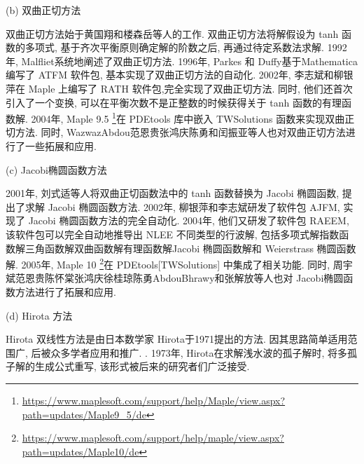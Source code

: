 (b) 双曲正切方法 

双曲正切方法始于黄国翔和楼森岳等人\cite{huang1989exact}的工作. 双曲正切方法将解假设为 tanh 函数的多项式, 基于齐次平衡原则确定解的阶数之后, 再通过待定系数法求解. 1992年, Malfliet\cite{malfliet1992solitary}系统地阐述了双曲正切方法. 1996年, Parkes 和 Duffy\cite{parkes1996automated}基于Mathematica 编写了 ATFM 软件包, 基本实现了双曲正切方法的自动化. 2002年, 李志斌和柳银萍\cite{liu2001master,li2002rath}在 Maple 上编写了 RATH 软件包,完全实现了双曲正切方法. 同时, 他们还首次引入了一个变换, 可以在平衡次数不是正整数的时候获得关于 tanh 函数的有理函数解. 2004年, Maple 9.5 \footnote{\url{https://www.maplesoft.com/support/help/Maple/view.aspx?path=updates/Maple9_5/de}}在 PDEtools 库中嵌入 TWSolutions 函数来实现双曲正切方法. 同时, Wazwaz\cite{wazwaz2004tanh}\D Abdou\cite{abdou2007extended}\D 范恩贵\cite{fan2000extended}\D 张鸿庆\cite{lu2003further}\D 陈勇\cite{zheng2003generalized}和闰振亚\cite{yan2001new}等人也对双曲正切方法进行了一些拓展和应用. 

(c) Jacobi椭圆函数方法

2001年, 刘式适等人\cite{liu2001jacobi}将双曲正切函数法中的 tanh 函数替换为 Jacobi 椭圆函数, 提出了求解 Jacobi 椭圆函数方法. 2002年, 柳银萍和李志斌\cite{yin2002automated}研发了软件包 AJFM, 实现了 Jacobi 椭圆函数方法的完全自动化. 2004年, 他们\cite{li2004raeem}又研发了软件包 RAEEM, 该软件包可以完全自动地推导出 NLEE 不同类型的行波解, 包括多项式解\D 指数函数解\D 三角函数解\D 双曲函数解\D 有理函数解\D Jacobi 椭圆函数解和 Weierstrass 椭圆函数解. 2005年, Maple 10 \footnote{\url{https://www.maplesoft.com/support/help/maple/view.aspx?path=updates/Maple10/de}}在 PDEtools[TWSolutions] 中集成了相关功能. 同时, 周宇斌\cite{zhou2003periodic}\D 范恩贵\cite{fan2002applications}\D 陈怀棠\cite{chen2003improved}\D 张鸿庆\cite{yu2005extended}\D 徐桂琼\cite{gui2005applications}\D 陈勇\cite{chen2005extended}\D Abdou\cite{abdou2007construction}\D Bhrawy\cite{bhrawy2013cnoidal}和张解放\cite{jia2004general,chao2005symbolic}等人也对 Jacobi椭圆函数方法进行了拓展和应用. 

(d) Hirota 方法

Hirota 双线性方法是由日本数学家 Hirota\cite{hirota1971exact}于1971提出的方法. 因其思路简单\D 适用范围广, 后被众多学者应用和推广. . 1973年, Hirota\cite{hirota1973exact}在求解浅水波的孤子解时, 将多孤子解的生成公式重写, 该形式被后来的研究者们广泛接受. 

